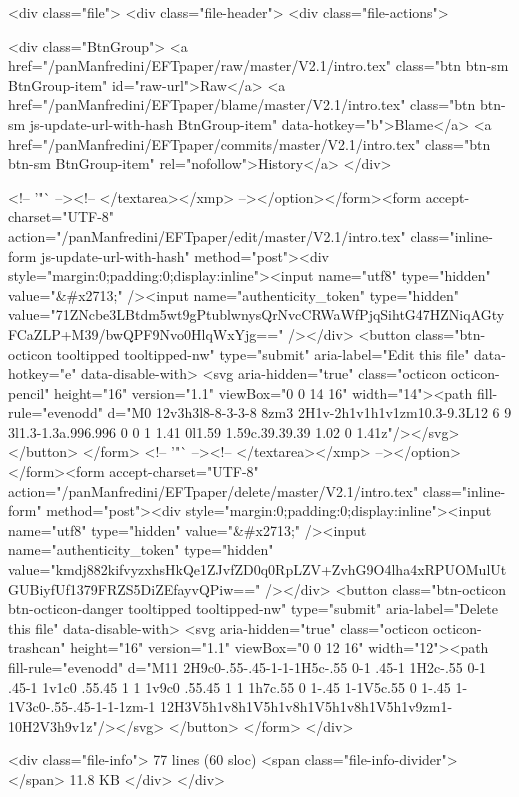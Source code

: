 <div class="file">
  <div class="file-header">
  <div class="file-actions">

    <div class="BtnGroup">
      <a href="/panManfredini/EFTpaper/raw/master/V2.1/intro.tex" class="btn btn-sm BtnGroup-item" id="raw-url">Raw</a>
        <a href="/panManfredini/EFTpaper/blame/master/V2.1/intro.tex" class="btn btn-sm js-update-url-with-hash BtnGroup-item" data-hotkey="b">Blame</a>
      <a href="/panManfredini/EFTpaper/commits/master/V2.1/intro.tex" class="btn btn-sm BtnGroup-item" rel="nofollow">History</a>
    </div>


        <!-- '"` --><!-- </textarea></xmp> --></option></form><form accept-charset="UTF-8" action="/panManfredini/EFTpaper/edit/master/V2.1/intro.tex" class="inline-form js-update-url-with-hash" method="post"><div style="margin:0;padding:0;display:inline"><input name="utf8" type="hidden" value="&#x2713;" /><input name="authenticity_token" type="hidden" value="71ZNcbe3LBtdm5wt9gPtublwnysQrNvcCRWaWfPjqSihtG47HZNiqAGtyFCaZLP+M39/bwQPF9Nvo0HlqWxYjg==" /></div>
          <button class="btn-octicon tooltipped tooltipped-nw" type="submit"
            aria-label="Edit this file" data-hotkey="e" data-disable-with>
            <svg aria-hidden="true" class="octicon octicon-pencil" height="16" version="1.1" viewBox="0 0 14 16" width="14"><path fill-rule="evenodd" d="M0 12v3h3l8-8-3-3-8 8zm3 2H1v-2h1v1h1v1zm10.3-9.3L12 6 9 3l1.3-1.3a.996.996 0 0 1 1.41 0l1.59 1.59c.39.39.39 1.02 0 1.41z"/></svg>
          </button>
</form>        <!-- '"` --><!-- </textarea></xmp> --></option></form><form accept-charset="UTF-8" action="/panManfredini/EFTpaper/delete/master/V2.1/intro.tex" class="inline-form" method="post"><div style="margin:0;padding:0;display:inline"><input name="utf8" type="hidden" value="&#x2713;" /><input name="authenticity_token" type="hidden" value="kmdj882kifvyzxhsHkQe1ZJvfZD0q0RpLZV+ZvhG9O4lha4xRPUOMulUtGUBiyfUf1379FRZS5DiZEfayvQPiw==" /></div>
          <button class="btn-octicon btn-octicon-danger tooltipped tooltipped-nw" type="submit"
            aria-label="Delete this file" data-disable-with>
            <svg aria-hidden="true" class="octicon octicon-trashcan" height="16" version="1.1" viewBox="0 0 12 16" width="12"><path fill-rule="evenodd" d="M11 2H9c0-.55-.45-1-1-1H5c-.55 0-1 .45-1 1H2c-.55 0-1 .45-1 1v1c0 .55.45 1 1 1v9c0 .55.45 1 1 1h7c.55 0 1-.45 1-1V5c.55 0 1-.45 1-1V3c0-.55-.45-1-1-1zm-1 12H3V5h1v8h1V5h1v8h1V5h1v8h1V5h1v9zm1-10H2V3h9v1z"/></svg>
          </button>
</form>  </div>

  <div class="file-info">
      77 lines (60 sloc)
      <span class="file-info-divider"></span>
    11.8 KB
  </div>
</div>

